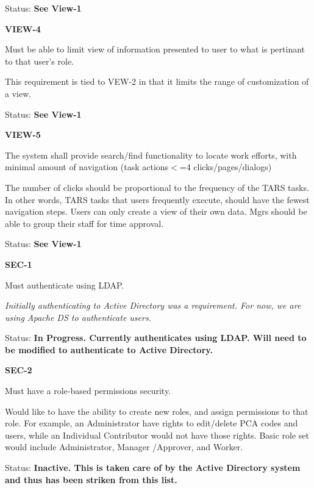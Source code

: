 \documentclass{article}
\begin{document}
\textit{ }Status: \textbf{See View-1}\textit{}

\noindent \textit{}


\noindent \textbf{VIEW-4}

\noindent Must be able to limit view of information presented to user to what is pertinant to that user's role.

This requirement is tied to VEW-2 in that it limits the range of customization of a view.

Status: \textbf{See View-1}

\noindent \textit{}


\noindent \textbf{VIEW-5}

\noindent The system shall provide search/find functionality to locate work efforts, with minimal amount of navigation (task actions$<$=4 clicks/pages/dialogs)

\noindent The number of clicks should be proportional to the frequency of the TARS tasks. In other words, TARS tasks that users frequently execute, should have the fewest navigation steps. Users can only create a view of their own data. Mgrs should be able to group their staff for time approval.

\noindent Status: \textbf{See View-1}

\noindent \textit{}


\noindent \textbf{SEC-1}

\noindent Must authenticate using LDAP.

\noindent \textit{Initially authenticating to Active Directory was a requirement. For now, we are using Apache DS to authenticate users. }

\noindent Status: \textbf{In Progress.  Currently authenticates using LDAP.  Will need to be modified to authenticate to Active Directory.}\textit{}

\noindent \textit{}


\noindent \textbf{SEC-2}

\noindent Must have a role-based permissions security.

\noindent Would like to have the ability to create new roles, and assign permissions to that role. For example, an Administrator have rights to edit/delete PCA codes and users, while an Individual Contributor would not have those rights. Basic role set would include Administrator, Manager /Approver, and Worker.

\noindent Status: \textbf{Inactive.  This is taken care of by the Active Directory system and thus has been striken from this list.}
\end{document}
